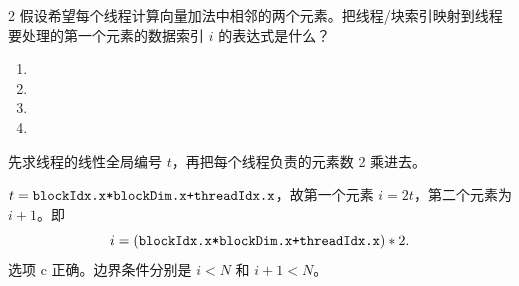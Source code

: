 \begin{solutionexercise}{2}
\problemheading 假设希望每个线程计算向量加法中相邻的两个元素。把线程/块索引映射到线程
要处理的第一个元素的数据索引 $i$ 的表达式是什么？
\begin{enumerate}[label=\alph*.,leftmargin=2.2em]
  \item {}
  \item {}
  \item {}
  \item {}
\end{enumerate}

\approachheading 先求线程的线性全局编号 $t$，再把每个线程负责的元素数 2 乘进去。

\answerheading $t=\code{blockIdx.x*blockDim.x+threadIdx.x}$，故第一个元素
$i=2t$，第二个元素为 $i+1$。即
\[
 i=(\code{blockIdx.x*blockDim.x+threadIdx.x})*2.
\]
选项 c 正确。边界条件分别是 $i<N$ 和 $i+1<N$。


\end{solutionexercise}
